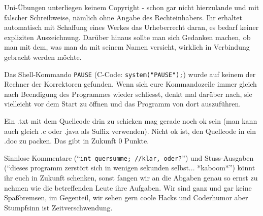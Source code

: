 \documentclass[%
	final, %
	normalheadings, %
	ngerman, %
	a4paper,
	1.1headlines, %
	pagesize, %
	halfparskip, %
	pointlessnumbers, %
	fleqn, %
]{scrartcl} %
\begin{document}
Uni-Übungen unterliegen keinem Copyright - schon gar nicht hierzulande und mit
falscher Schreibweise, nämlich ohne Angabe des Rechteinhabers. Ihr erhaltet
automatisch mit Schaffung eines Werkes das Urheberrecht daran, es bedarf
keiner expliziten Auszeichnung. Darüber hinaus sollte man sich Gedanken
machen, ob man mit dem, was man da mit seinem Namen versieht, wirklich in
Verbindung gebracht werden möchte.

Das Shell-Kommando \texttt{PAUSE} (C-Code: \texttt{system("PAUSE");}) wurde auf
keinem der Rechner der Korrektoren gefunden. Wenn sich eure Kommandozeile immer
gleich nach Beendigung des Programmes wieder schliesst, denkt mal darüber nach,
sie vielleicht vor dem Start zu öffnen und das Programm von dort auszuführen.

Ein .txt mit dem Quellcode drin zu schicken mag gerade noch ok sein (man kann
auch gleich .c oder .java als Suffix verwenden). Nicht ok ist, den Quellcode
in ein .doc zu packen. Das gibt in Zukunft 0 Punkte.

Sinnlose Kommentare (``\texttt{int quersumme; //klar, oder?}'') und
Stuss-Ausgaben (``dieses programm zerstört sich in wenigen sekunden selbst...
*kaboom*'') könnt ihr euch in Zukunft schenken, sonst fangen wir an die Abgaben
genau so ernst zu nehmen wie die betreffenden Leute ihre Aufgaben. Wir sind
ganz und gar keine Spaßbremsen, im Gegenteil, wir sehen gern coole Hacks und
Coderhumor aber Stumpfsinn ist Zeitverschwendung.
\end{document}
